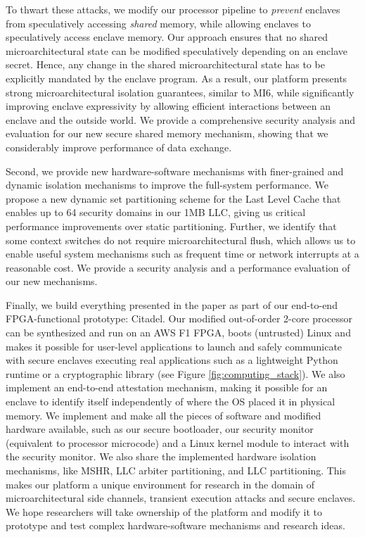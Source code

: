 To thwart these attacks, we modify our processor pipeline to \textit{prevent} enclaves from speculatively accessing \textit{shared} memory, while allowing enclaves to speculatively access enclave memory.
Our approach ensures that no shared microarchitectural state can be modified speculatively depending on an enclave secret.
Hence, any change in the shared microarchitectural state has to be explicitly mandated by the enclave program.
As a result, our platform presents strong microarchitectural isolation guarantees, similar to MI6, while significantly improving enclave expressivity by allowing efficient interactions between an enclave and the outside world. 
We provide a comprehensive security analysis and evaluation for our new secure shared memory mechanism, showing that we considerably improve performance of data exchange.

Second, we provide new hardware-software mechanisms with finer-grained and dynamic isolation mechanisms to improve the full-system performance. 
We propose a new dynamic set partitioning scheme for the Last Level Cache that enables up to 64 security domains in our 1MB LLC, giving us critical performance improvements over static partitioning.
Further, we identify that some context switches do not require  microarchitectural flush, which allows us to enable useful system mechanisms such as frequent time or network interrupts at a reasonable cost.
We provide a security analysis and a performance evaluation of our new mechanisms.

Finally, we build everything presented in the paper as part of our end-to-end FPGA-functional prototype: Citadel. 
Our modified out-of-order 2-core processor can be synthesized and run on an AWS F1 FPGA, boots (untrusted) Linux and makes it possible for user-level applications to launch and safely communicate with secure enclaves executing real applications such as a lightweight Python runtime or a cryptographic library (see Figure \ref{fig:computing_stack}).
We also implement an end-to-end attestation mechanism, making it possible for an enclave to identify itself independently of where the OS placed it in physical memory.
We implement and make all the pieces of software and modified hardware available, such as our secure bootloader, our security monitor (equivalent to processor microcode) and a Linux kernel module to interact with the security monitor.
We also share the implemented hardware isolation mechanisms, like MSHR, LLC arbiter partitioning, and LLC partitioning.
This makes our platform a unique environment for research in the domain of microarchitectural side channels, transient execution attacks and secure enclaves.
We hope researchers will take ownership of the platform and modify it to prototype and test complex hardware-software mechanisms and research ideas.

